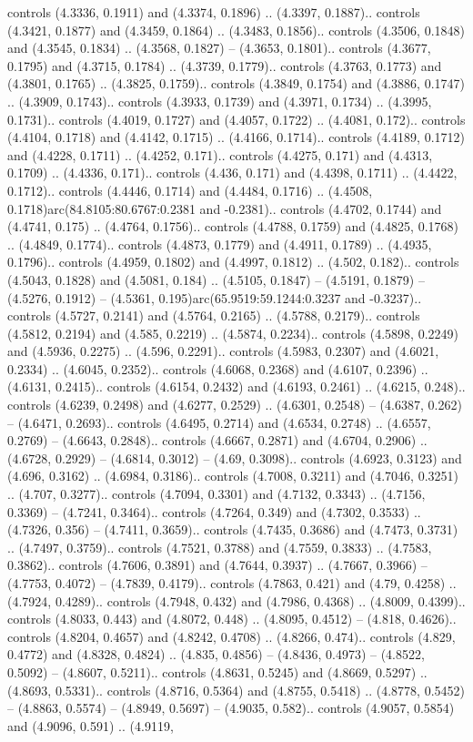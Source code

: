 controls (4.3336, 0.1911) and (4.3374, 0.1896) .. (4.3397, 0.1887).. controls (4.3421, 0.1877) and (4.3459, 0.1864) .. (4.3483, 0.1856).. controls (4.3506, 0.1848) and (4.3545, 0.1834) .. (4.3568, 0.1827) -- (4.3653, 0.1801).. controls (4.3677, 0.1795) and (4.3715, 0.1784) .. (4.3739, 0.1779).. controls (4.3763, 0.1773) and (4.3801, 0.1765) .. (4.3825, 0.1759).. controls (4.3849, 0.1754) and (4.3886, 0.1747) .. (4.3909, 0.1743).. controls (4.3933, 0.1739) and (4.3971, 0.1734) .. (4.3995, 0.1731).. controls (4.4019, 0.1727) and (4.4057, 0.1722) .. (4.4081, 0.172).. controls (4.4104, 0.1718) and (4.4142, 0.1715) .. (4.4166, 0.1714).. controls (4.4189, 0.1712) and (4.4228, 0.1711) .. (4.4252, 0.171).. controls (4.4275, 0.171) and (4.4313, 0.1709) .. (4.4336, 0.171).. controls (4.436, 0.171) and (4.4398, 0.1711) .. (4.4422, 0.1712).. controls (4.4446, 0.1714) and (4.4484, 0.1716) .. (4.4508, 0.1718)arc(84.8105:80.6767:0.2381 and -0.2381).. controls (4.4702, 0.1744) and (4.4741, 0.175) .. (4.4764, 0.1756).. controls (4.4788, 0.1759) and (4.4825, 0.1768) .. (4.4849, 0.1774).. controls (4.4873, 0.1779) and (4.4911, 0.1789) .. (4.4935, 0.1796).. controls (4.4959, 0.1802) and (4.4997, 0.1812) .. (4.502, 0.182).. controls (4.5043, 0.1828) and (4.5081, 0.184) .. (4.5105, 0.1847) -- (4.5191, 0.1879) -- (4.5276, 0.1912) -- (4.5361, 0.195)arc(65.9519:59.1244:0.3237 and -0.3237).. controls (4.5727, 0.2141) and (4.5764, 0.2165) .. (4.5788, 0.2179).. controls (4.5812, 0.2194) and (4.585, 0.2219) .. (4.5874, 0.2234).. controls (4.5898, 0.2249) and (4.5936, 0.2275) .. (4.596, 0.2291).. controls (4.5983, 0.2307) and (4.6021, 0.2334) .. (4.6045, 0.2352).. controls (4.6068, 0.2368) and (4.6107, 0.2396) .. (4.6131, 0.2415).. controls (4.6154, 0.2432) and (4.6193, 0.2461) .. (4.6215, 0.248).. controls (4.6239, 0.2498) and (4.6277, 0.2529) .. (4.6301, 0.2548) -- (4.6387, 0.262) -- (4.6471, 0.2693).. controls (4.6495, 0.2714) and (4.6534, 0.2748) .. (4.6557, 0.2769) -- (4.6643, 0.2848).. controls (4.6667, 0.2871) and (4.6704, 0.2906) .. (4.6728, 0.2929) -- (4.6814, 0.3012) -- (4.69, 0.3098).. controls (4.6923, 0.3123) and (4.696, 0.3162) .. (4.6984, 0.3186).. controls (4.7008, 0.3211) and (4.7046, 0.3251) .. (4.707, 0.3277).. controls (4.7094, 0.3301) and (4.7132, 0.3343) .. (4.7156, 0.3369) -- (4.7241, 0.3464).. controls (4.7264, 0.349) and (4.7302, 0.3533) .. (4.7326, 0.356) -- (4.7411, 0.3659).. controls (4.7435, 0.3686) and (4.7473, 0.3731) .. (4.7497, 0.3759).. controls (4.7521, 0.3788) and (4.7559, 0.3833) .. (4.7583, 0.3862).. controls (4.7606, 0.3891) and (4.7644, 0.3937) .. (4.7667, 0.3966) -- (4.7753, 0.4072) -- (4.7839, 0.4179).. controls (4.7863, 0.421) and (4.79, 0.4258) .. (4.7924, 0.4289).. controls (4.7948, 0.432) and (4.7986, 0.4368) .. (4.8009, 0.4399).. controls (4.8033, 0.443) and (4.8072, 0.448) .. (4.8095, 0.4512) -- (4.818, 0.4626).. controls (4.8204, 0.4657) and (4.8242, 0.4708) .. (4.8266, 0.474).. controls (4.829, 0.4772) and (4.8328, 0.4824) .. (4.835, 0.4856) -- (4.8436, 0.4973) -- (4.8522, 0.5092) -- (4.8607, 0.5211).. controls (4.8631, 0.5245) and (4.8669, 0.5297) .. (4.8693, 0.5331).. controls (4.8716, 0.5364) and (4.8755, 0.5418) .. (4.8778, 0.5452) -- (4.8863, 0.5574) -- (4.8949, 0.5697) -- (4.9035, 0.582).. controls (4.9057, 0.5854) and (4.9096, 0.591) .. (4.9119, 